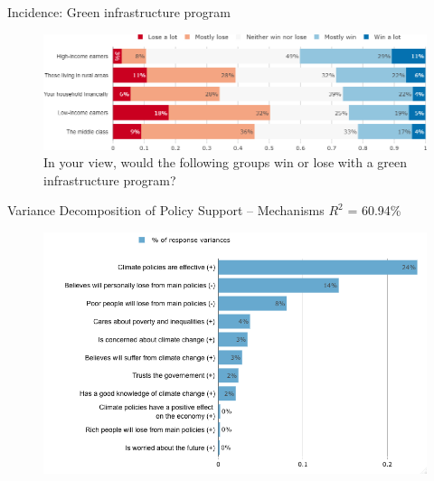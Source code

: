 \begin{framefont}{\small}
\begin{frame}{Incidence: Green infrastructure program}%
	\begin{figure}[h!]
	\centering
	\caption{In your view, would the following groups win or lose with a green infrastructure program?}
	\includegraphics[width=.87\paperwidth]{../figures/FR/investments_win_lose_FR.png}
	\end{figure}
\end{frame}


\begin{frame}{Variance Decomposition of Policy Support -- Mechanisms}%
\vspace{-.1cm}
{\footnotesize $R^2$ = 60.94\%}
\begin{figure}[h!]
\vspace{-.1cm}
\includegraphics[width=.7\textwidth]{../figures/FR/lmg_main_policies_indices_non_standardized} \\
\end{figure}
\end{frame}



\end{framefont}
